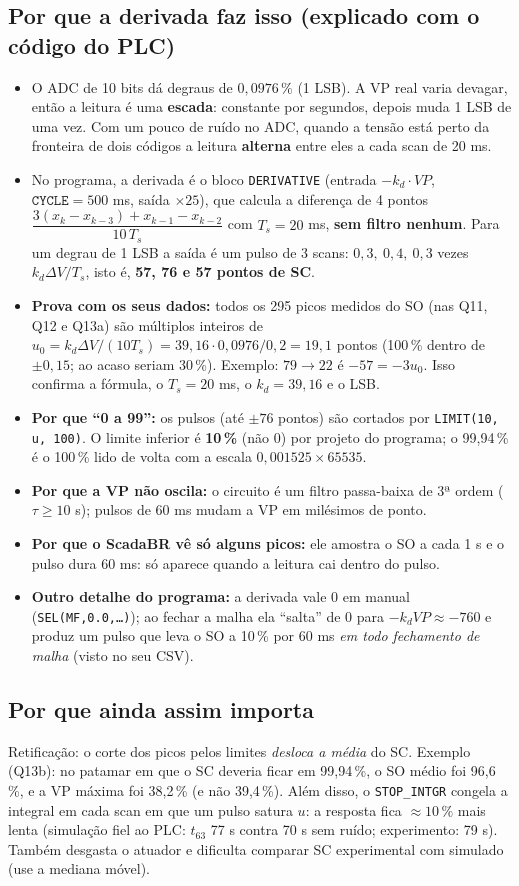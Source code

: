\documentclass[11pt,a4paper]{article}
\begin{document}
\subsection{Por que a derivada faz isso (explicado com o código do PLC)}
\begin{itemize}
\item O ADC de 10 bits dá degraus de $0{,}0976\,\%$ (1 LSB). A VP real varia devagar, então a leitura é uma \textbf{escada}: constante por segundos, depois muda 1 LSB de uma vez. Com um pouco de ruído no ADC, quando a tensão está perto da fronteira de dois códigos a leitura \textbf{alterna} entre eles a cada scan de 20 ms.
\item No programa, a derivada é o bloco \texttt{DERIVATIVE} (entrada $-k_d\cdot VP$, $\texttt{CYCLE}=500$ ms, saída $\times25$), que calcula a diferença de 4 pontos $\dfrac{3(x_k-x_{k-3})+x_{k-1}-x_{k-2}}{10\,T_s}$ com $T_s=20$ ms, \textbf{sem filtro nenhum}. Para um degrau de 1 LSB a saída é um pulso de 3 scans: $0{,}3,\ 0{,}4,\ 0{,}3$ vezes $k_d\Delta V/T_s$, isto é, \textbf{57, 76 e 57 pontos de SC}.
\item \textbf{Prova com os seus dados:} todos os 295 picos medidos do SO (nas Q11, Q12 e Q13a) são múltiplos inteiros de $u_0=k_d\Delta V/(10T_s)=39{,}16\cdot0{,}0976/0{,}2=19{,}1$ pontos (100\,\% dentro de $\pm0{,}15$; ao acaso seriam 30\,\%). Exemplo: $79\to22$ é $-57=-3u_0$. Isso confirma a fórmula, o $T_s=20$ ms, o $k_d=39{,}16$ e o LSB.
\item \textbf{Por que ``0 a 99'':} os pulsos (até $\pm76$ pontos) são cortados por \texttt{LIMIT(10,\,u,\,100)}. O limite inferior é \textbf{10\,\%} (não 0) por projeto do programa; o 99,94\,\% é o 100\,\% lido de volta com a escala $0{,}001525\times65535$.
\item \textbf{Por que a VP não oscila:} o circuito é um filtro passa-baixa de 3ª ordem ($\tau\ge10$ s); pulsos de 60 ms mudam a VP em milésimos de ponto.
\item \textbf{Por que o ScadaBR vê só alguns picos:} ele amostra o SO a cada 1 s e o pulso dura 60 ms: só aparece quando a leitura cai dentro do pulso.
\item \textbf{Outro detalhe do programa:} a derivada vale 0 em manual (\texttt{SEL(MF,0.0,\ldots)}); ao fechar a malha ela ``salta'' de 0 para $-k_dVP\approx-760$ e produz um pulso que leva o SO a 10\,\% por 60 ms \emph{em todo fechamento de malha} (visto no seu CSV).
\end{itemize}
\subsection{Por que ainda assim importa}
Retificação: o corte dos picos pelos limites \emph{desloca a média} do SC. Exemplo (Q13b): no patamar em que o SC deveria ficar em 99,94\,\%, o SO médio foi 96,6\,\%, e a VP máxima foi 38,2\,\% (e não 39,4\,\%). Além disso, o \texttt{STOP\_INTGR} congela a integral em cada scan em que um pulso satura $u$: a resposta fica $\approx10\,\%$ mais lenta (simulação fiel ao PLC: $t_{63}$ 77 s contra 70 s sem ruído; experimento: 79 s). Também desgasta o atuador e dificulta comparar SC experimental com simulado (use a mediana móvel).
\end{document}
